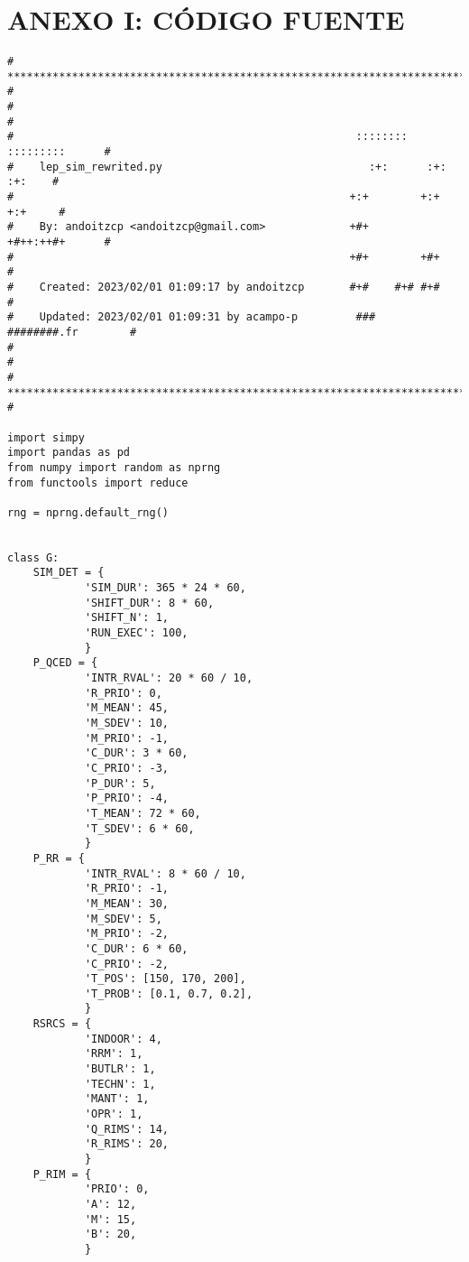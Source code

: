 \appendix
\section{ANEXO I: CÓDIGO FUENTE}\label{apnd2}

\begin{verbatim}
# **************************************************************************** #
#                                                                              #
#                                                     ::::::::  :::::::::      #
#    lep_sim_rewrited.py                                :+:      :+:    :+:    #
#                                                    +:+        +:+    +:+     #
#    By: andoitzcp <andoitzcp@gmail.com>             +#+        +#++:++#+      #
#                                                    +#+        +#+            #
#    Created: 2023/02/01 01:09:17 by andoitzcp       #+#    #+# #+#            #
#    Updated: 2023/02/01 01:09:31 by acampo-p         ###   ########.fr        #
#                                                                              #
# **************************************************************************** #

import simpy
import pandas as pd
from numpy import random as nprng
from functools import reduce

rng = nprng.default_rng()


class G:
    SIM_DET = {
            'SIM_DUR': 365 * 24 * 60,
            'SHIFT_DUR': 8 * 60,
            'SHIFT_N': 1,
            'RUN_EXEC': 100,
            }
    P_QCED = {
            'INTR_RVAL': 20 * 60 / 10,
            'R_PRIO': 0,
            'M_MEAN': 45,
            'M_SDEV': 10,
            'M_PRIO': -1,
            'C_DUR': 3 * 60,
            'C_PRIO': -3,
            'P_DUR': 5,
            'P_PRIO': -4,
            'T_MEAN': 72 * 60,
            'T_SDEV': 6 * 60,
            }
    P_RR = {
            'INTR_RVAL': 8 * 60 / 10,
            'R_PRIO': -1,
            'M_MEAN': 30,
            'M_SDEV': 5,
            'M_PRIO': -2,
            'C_DUR': 6 * 60,
            'C_PRIO': -2,
            'T_POS': [150, 170, 200],
            'T_PROB': [0.1, 0.7, 0.2],
            }
    RSRCS = {
            'INDOOR': 4,
            'RRM': 1,
            'BUTLR': 1,
            'TECHN': 1,
            'MANT': 1,
            'OPR': 1,
            'Q_RIMS': 14,
            'R_RIMS': 20,
            }
    P_RIM = {
            'PRIO': 0,
            'A': 12,
            'M': 15,
            'B': 20,
            }



\end{verbatim}
